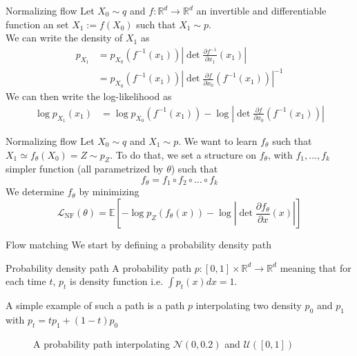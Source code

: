 \documentclass{beamer}
\begin{document}
\begin{frame}{Normalizing flow}
    Let \(X_0\sim q\) and \(f:\mathbb{R}^d\rightarrow\mathbb{R}^d\) an invertible and differentiable function an set  \(X_1:=f(X_0)\) such that \(X_1\sim p\).\\
    We can write the density of \(X_1\) as
    \begin{align}
        p_{X_1} &= p_{X_0}(f^{-1}(x_1))\left| \det \frac{\partial f^{-1}}{\partial x_1}(x_1)\right|\\
        &= p_{X_0}(f^{-1}(x_1))\left| \det \frac{\partial f}{\partial x_0}(f^{-1}(x_1))\right|^{-1} 
    \end{align}
    We can then write the log-likelihood as
    \begin{align}
        \log p_{X_1}(x_1) &= \log p_{X_0}(f^{-1}(x_1))-\log \left| \det \frac{\partial f}{\partial x_0}(f^{-1}(x_1))\right|
    \end{align}
\end{frame}

\begin{frame}{Normalizing flow}
    Let \(X_0\sim q\) and \(X_1\sim p\). We want to learn \(f_\theta\) such that \(X_1 \simeq f_\theta(X_0)=Z\sim p_Z\). To do that, we set a structure on \(f_\theta\), with \(f_1,\ldots,f_k\) simpler function (all parametrized by \(\theta\)) such that 
    \[f_\theta=f_1\circ f_2\circ\ldots\circ f_k\] 
    We determine \(f_\theta\) by minimizing 
    \[\mathcal{L}_\text{NF}(\theta)= \mathbb{E}\left[-\log p_Z(f_\theta(x))-\log \left|\det \frac{\partial f_\theta}{\partial x}(x)\right|\right]\]
\end{frame}

\begin{frame}{Flow matching}
    We start by defining a probability density path
    \begin{block}{Probability density path}
        A probability path \(p:[0,1]\times\mathbb{R}^d\rightarrow\mathbb{R}^d\) meaning that for each time \(t\), \(p_t\) is density function i.e. \(\int p_t(x)dx=1\).\\
    \end{block}
    A simple example of such a path is a path \(p\) interpolating two density \(p_0\) and \(p_1\) with \(p_t=tp_1+(1-t)p_0\)
    \begin{figure}[htbp]
        \centering
        \caption{A probability path interpolating $\mathcal{N}(0,0.2)$ and $\mathcal{U}([0,1])$}
    \end{figure}
\end{frame}
\end{document}
